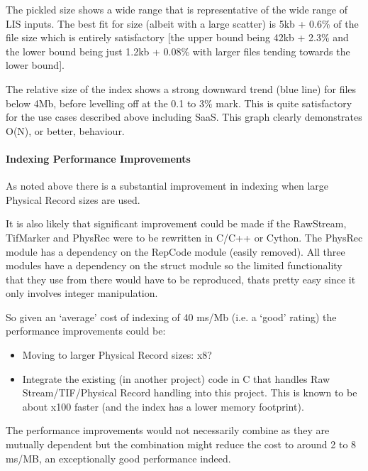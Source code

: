 \documentclass[letterpaper,10pt,english]{sphinxmanual}
\begin{document}
\noindent{}

The pickled size shows a wide range that is representative of the wide range of LIS inputs. The best fit for size (albeit with a large scatter) is 5kb + 0.6\% of the file size which is entirely satisfactory {[}the upper bound being 42kb + 2.3\% and the lower bound being just 1.2kb + 0.08\% with larger files tending towards the lower bound{]}.

The relative size of the index shows a strong downward trend (blue line) for files below 4Mb, before levelling off at the 0.1 to 3\% mark. This is quite satisfactory for the use cases described above including SaaS. This graph clearly demonstrates O(N), or better, behaviour.


\paragraph{Indexing Performance Improvements}
\label{\detokenize{tech/LIS_indexing:indexing-performance-improvements}}\label{\detokenize{tech/LIS_indexing:totaldepth-tech-indexing-perf-improve}}
As noted above there is a substantial improvement in indexing when large Physical Record sizes are used.

It is also likely that significant improvement could be made if the RawStream, TifMarker and PhysRec were to be rewritten in C/C++ or Cython. The PhysRec module has a dependency on the RepCode module (easily removed). All three modules have a dependency on the struct module so the limited functionality that they use from there would have to be reproduced, thats pretty easy since it only involves integer manipulation.

So given an ‘average’ cost of indexing of 40 ms/Mb (i.e. a ‘good’ rating) the performance improvements could be:
\begin{itemize}
\item {} 
Moving to larger Physical Record sizes: x8?

\item {} 
Integrate the existing (in another project) code in C that handles Raw Stream/TIF/Physical Record handling into this project. This is known to be about x100 faster (and the index has a lower memory footprint).

\end{itemize}

The performance improvements would not necessarily combine as they are mutually dependent but the combination might reduce the cost to around 2 to 8 ms/MB, an exceptionally good performance indeed.
\end{document}

